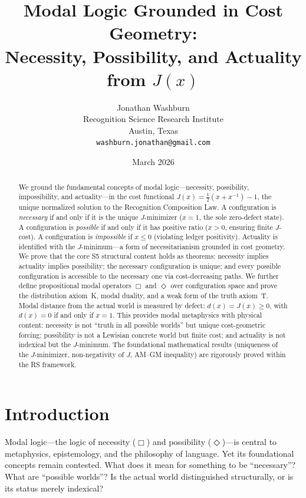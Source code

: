 \documentclass[12pt,a4paper]{article}
\title{Modal Logic Grounded in Cost Geometry:\\
Necessity, Possibility, and Actuality from $J(x)$}
\author{Jonathan Washburn\\
Recognition Science Research Institute\\
Austin, Texas\\
\texttt{washburn.jonathan@gmail.com}}
\date{March 2026}
\theoremstyle{definition}
\theoremstyle{remark}
\begin{document}
\maketitle

\begin{abstract}
We ground the fundamental concepts of modal logic---necessity,
possibility, impossibility, and actuality---in the cost functional
$J(x) = \tfrac{1}{2}(x + x^{-1}) - 1$, the unique normalized solution
to the Recognition Composition Law.  A configuration is \emph{necessary}
if and only if it is the unique $J$-minimizer ($x = 1$, the sole
zero-defect state).  A configuration is \emph{possible} if and only if
it has positive ratio ($x > 0$, ensuring finite $J$-cost).  A
configuration is \emph{impossible} if $x \leq 0$ (violating ledger
positivity).  Actuality is identified with the $J$-minimum---a form of
necessitarianism grounded in cost geometry.  We prove that the core S5
structural content holds as theorems: necessity implies actuality implies
possibility; the necessary configuration is unique; and every possible
configuration is accessible to the necessary one via cost-decreasing
paths.  We further define propositional modal operators $\Box$ and
$\Diamond$ over configuration space and prove the distribution axiom~K,
modal duality, and a weak form of the truth axiom~T.  Modal distance
from the actual world is measured by defect: $d(x) = J(x) \geq 0$, with
$d(x) = 0$ if and only if $x = 1$.  This provides modal metaphysics
with physical content: necessity is not ``truth in all possible worlds''
but unique cost-geometric forcing; possibility is not a Lewisian concrete
world but finite cost; and actuality is not indexical but the
$J$-minimum.  The foundational mathematical results (uniqueness of the
$J$-minimizer, non-negativity of $J$, AM--GM inequality) are
rigorously proved within the RS framework.
\end{abstract}

\section{Introduction}
\label{sec:intro}

Modal logic---the logic of necessity ($\Box$) and possibility
($\Diamond$)---is central to metaphysics, epistemology, and the
philosophy of language.  Yet its foundational concepts remain contested.
What does it mean for something to be ``necessary''?  What are
``possible worlds''?  Is the actual world distinguished structurally, or
is its status merely indexical?
\end{document}
